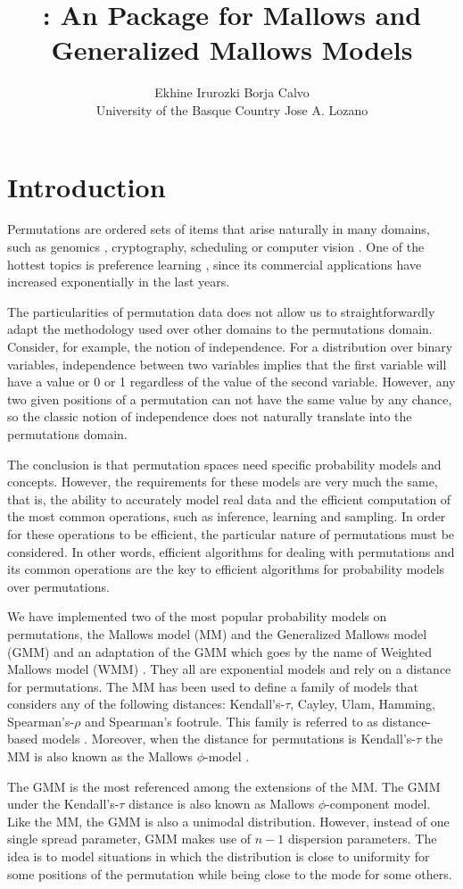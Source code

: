 \documentclass[article,nojss]{jss}
\author{
  Ekhine Irurozki %
	\And 
	Borja Calvo \\ University of the Basque Country
	\And
	Jose A. Lozano \\ %
        }
\title{\pkg{PerMallows}: An \proglang{R} Package for Mallows and Generalized Mallows Models}
\begin{document}
\section{Introduction} 
Permutations are ordered sets of items that arise naturally in many domains, such as genomics \citep{Bader11}, cryptography, scheduling or computer vision \citep{NIPS2012_0012}. One of the hottest topics is preference learning \citep{Preferences}, since its commercial applications have increased exponentially in the last years. 

The particularities of permutation data does not allow us to straightforwardly adapt the methodology used over other domains to the permutations domain. Consider, for example, the notion of independence. For a distribution over binary variables, independence between two variables implies that the first variable will have a value or 0 or 1 regardless of the value of the second variable. However, any two given positions of a permutation can not have the same value by any chance, so the classic notion of independence does not naturally translate into the permutations domain. 

The conclusion is that permutation spaces need specific probability models and concepts. However, the requirements for these models are very much the same, that is, the ability to accurately model real data and the efficient computation of the most common operations, such as inference, learning and sampling. In order for these operations to be efficient, the particular nature of permutations must be considered. In other words, efficient algorithms for dealing with permutations and its common operations are the key to efficient algorithms for probability models over permutations. 

We have implemented two of the most popular probability models on permutations, the Mallows model (MM) \citep{mallows} and the Generalized Mallows model (GMM) \citep{gMallows} and an adaptation of the GMM which goes by the name of Weighted Mallows model (WMM) \citep{Irurozki2014a}. They all are exponential models and rely on a distance for permutations. The MM has been used to define a family of models that considers any of the following distances: Kendall's-$\tau$, Cayley, Ulam, Hamming, Spearman's-$\rho$ and Spearman's footrule. This family is referred to as distance-based models \citep{diaconis88}. Moreover, when the distance for permutations is Kendall's-$\tau$ the MM is also known as the Mallows $\phi$-model \citep{critchlow91}. 

The GMM is the most referenced among the extensions of the MM. The GMM under the Kendall's-$\tau$ distance is also known as Mallows $\phi$-component model. Like the MM, the GMM is also a unimodal distribution. However, instead of one single spread parameter, GMM makes use of $n-1$ dispersion parameters. The idea is to model situations in which the distribution is close to uniformity for some positions of the permutation while being close to the mode for some others. 
\end{document}
